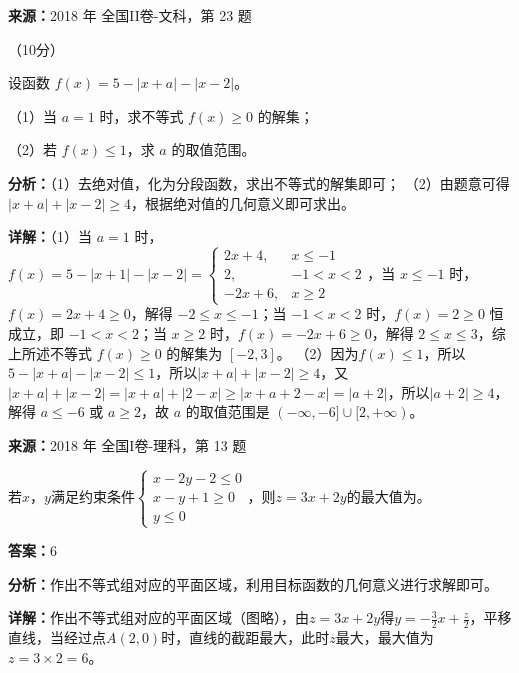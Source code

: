 \begin{question}[points=10]
\textbf{来源：}2018 年 全国II卷-文科，第 23 题\par
[选修4-5：不等式选讲]（10分）

设函数 $f(x)=5-|x+a|-|x-2|$。

（1）当 $a=1$ 时，求不等式 $f(x)\geq0$ 的解集；

（2）若 $f(x)\leq1$，求 $a$ 的取值范围。
\begin{solution}

\textbf{分析：}（1）去绝对值，化为分段函数，求出不等式的解集即可；
（2）由题意可得 $|x+a|+|x-2|\geq4$，根据绝对值的几何意义即可求出。

\textbf{详解：}（1）当 $a=1$ 时，$f(x)=5-|x+1|-|x-2|=\begin{cases} 2x+4, & x\leq-1 \\ 2, & -1<x<2 \\ -2x+6, & x\geq2 \end{cases}$，当 $x\leq-1$ 时，$f(x)=2x+4\geq0$，解得 $-2\leq x\leq-1$；当 $-1<x<2$ 时，$f(x)=2\geq0$ 恒成立，即 $-1<x<2$；当 $x\geq2$ 时，$f(x)=-2x+6\geq0$，解得 $2\leq x\leq3$，综上所述不等式 $f(x)\geq0$ 的解集为 $[-2,3]$。
（2）因为$f(x)\leq1$，所以$5-|x+a|-|x-2|\leq1$，所以$|x+a|+|x-2|\geq4$，又 $|x+a|+|x-2|=|x+a|+|2-x|\geq|x+a+2-x|=|a+2|$，所以$|a+2|\geq4$，解得 $a\leq-6$ 或 $a\geq2$，故 $a$ 的取值范围是 $(-\infty,-6]\cup[2,+\infty)$。
\end{solution}
\end{question}

\begin{question}[points=5]
\textbf{来源：}2018 年 全国I卷-理科，第 13 题\par
若$x$，$y$满足约束条件$\begin{cases} x-2y-2\leq0 \\ x-y+1\geq0 \\ y\leq0 \end{cases}$，则$z=3x+2y$的最大值为。
\fillin[{$6$}]
\begin{solution}
\textbf{答案：}$6$

\textbf{分析：}作出不等式组对应的平面区域，利用目标函数的几何意义进行求解即可。

\textbf{详解：}作出不等式组对应的平面区域（图略），由$z=3x+2y$得$y=-\frac{3}{2}x+\frac{z}{2}$，平移直线，当经过点$A(2,0)$时，直线的截距最大，此时$z$最大，最大值为$z=3\times2=6$。
\end{solution}
\end{question}

